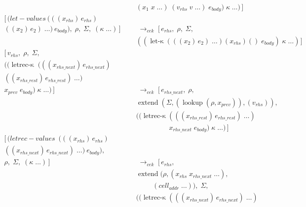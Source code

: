 \begin{figure}
{\begin{minipage}{\textwidth}
\begin{align*}
        & (x_1\;x\;\ldots)\;(v_{rhs}\;v\;\ldots)\;e_{body})\;\kappa\;\ldots)\,]\\
        [\,(let\!-\!values\ (((x_{rhs})\,e_{rhs}) \hspace{2cm} & \; \\
        ((x_2)\,e_2)\;\ldots)\ e_{body}),\;\rho,\;\Sigma,\;(\kappa\;\ldots)\,] &\;\longrightarrow_{\textit{cek}}\;
        [\,e_{rhs},\;\rho,\;\Sigma, \\
        & ((\operatorname{let-\kappa}(((x_2)\,e_2)\;\ldots)(x_{rhs})()\;e_{body})\;\kappa\;\ldots)\,]\\
        [\,v_{rhs},\;\rho,\;\Sigma, \hspace{4cm} \\
        ((\operatorname{letrec-\kappa}\; (((x_{rhs\_next})\,e_{rhs\_next}) \hspace{0cm} \\
        ((x_{rhs\_rest})\,e_{rhs\_rest})\;\ldots)\\ 
        x_{prev}\;e_{body})\;\kappa\;\ldots)\,] &\;\longrightarrow_{\textit{cek}}\;
        [\,e_{rhs\_next},\;\rho,\\
        & \operatorname{extend}(\Sigma,(\operatorname{lookup}(\rho,x_{prev})),(v_{rhs})),\\
        & ((\operatorname{letrec-\kappa}(((x_{rhs\_rest})\,e_{rhs\_rest})\;\ldots) \\
        & \hspace{2cm} x_{rhs\_next}\;e_{body})\;\kappa\;\ldots)\,] \\
        [\,(letrec\!-\!values\ \; (((x_{rhs})\,e_{rhs}) \hspace{1cm} & \; \\
        ((x_{rhs\_next})\,e_{rhs\_next})\;\ldots)\ e_{body}), & \; \\ 
        \rho,\;\Sigma,\;(\kappa\;\ldots)\,] &\;\longrightarrow_{\textit{cek}}\; [\,e_{rhs},\\
        & \operatorname{extend}(\rho,(x_{rhs}\;x_{rhs\_next}\;\ldots),\\
                & \hspace{1cm} (cell_{addr}\;\ldots)),\;\Sigma,\\
        & ((\operatorname{letrec-\kappa}(((x_{rhs\_next})\,e_{rhs\_next})\;\ldots)\\

\end{align*}
\end{minipage}}
\end{figure}
